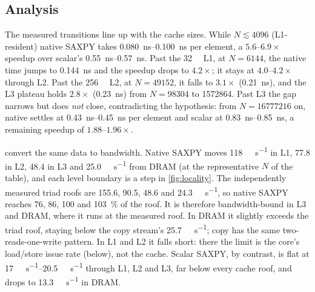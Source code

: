 \subsection{Analysis}
The measured transitions line up with the cache sizes. While $N\lesssim\num{4096}$ (L1-resident)
native SAXPY takes \qtyrange{0.080}{0.100}{\nano\second} per element, a $5.6\text{--}6.9\times$
speedup over scalar's \qtyrange{0.55}{0.57}{\nano\second}. Past the \qty{32}{\kibi\byte} L1, at
$N=\num{6144}$, the native time jumps to \qty{0.144}{\nano\second} and the speedup drops to
$4.2\times$; it stays at $4.0\text{--}4.2\times$ through L2. Past the \qty{256}{\kibi\byte} L2,
at $N=\num{49152}$, it falls to $3.1\times$ (\qty{0.21}{\nano\second}), and the L3 plateau holds
$2.8\times$ (\qty{0.23}{\nano\second}) from $N=\num{98304}$ to \num{1572864}. Past L3 the gap
narrows but does \emph{not} close, contradicting the hypothesis: from $N=\num{16777216}$ on, native
settles at \qtyrange{0.43}{0.45}{\nano\second} per element and scalar at
\qtyrange{0.83}{0.85}{\nano\second}, a remaining speedup of $1.88\text{--}1.96\times$.

 convert the same data to bandwidth. Native SAXPY moves
\qty{118}{\gibi\byte\per\second} in L1, \num{77.8} in L2, \num{48.4} in L3 and
\qty{25.0}{\gibi\byte\per\second} from DRAM (at the representative $N$ of the table), and each level
boundary is a step in \cref{fig:locality}. The independently measured triad roofs are \num{155.6},
\num{90.5}, \num{48.6} and \qty{24.3}{\gibi\byte\per\second}, so native SAXPY reaches 76, 86, 100
and \SI{103}{\percent} of the roof. It is therefore bandwidth-bound in L3 and DRAM, where it runs at
the measured roof. In DRAM it slightly exceeds the triad roof, staying below the copy stream's
\qty{25.7}{\gibi\byte\per\second}; copy has the same two-reads-one-write pattern. In L1 and L2 it falls short: there the limit is the core's
load/store issue rate (below), not the cache. Scalar SAXPY, by contrast, is flat at
\qtyrange{17}{20.5}{\gibi\byte\per\second} through L1, L2 and L3, far below every cache roof, and
drops to \qty{13.3}{\gibi\byte\per\second} in DRAM.

